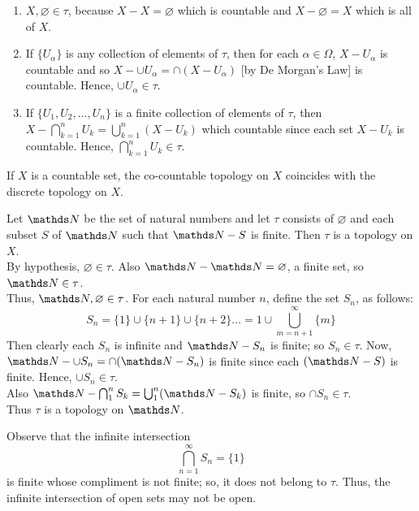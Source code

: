 \documentclass[../main-sheet.tex]{subfiles}
\begin{document}
\begin{enumerate}[label=(\roman*)]
    \item  \(X, \varnothing \in \tau\), because  \(X-X=\varnothing\) which is countable and  \(X-\varnothing=X\) which is all of  \(X\).
    \item If  \(\{U_\alpha\}\) is any collection of elements of  \(\tau\), then for each  \(\alpha\in\Omega\),  \(X-U_\alpha\) is countable and so  \(X-\cup U_\alpha =\cap (X-U_\alpha)\) [by De Morgan's Law] is countable. Hence,  \(\cup U_\alpha \in \tau\).
    \item If  \(\{U_1, U_2,\dots, U_n\}\) is a finite collection of elements of  \(\tau\), then  \(\displaystyle X-\bigcap_{k=1}^n U_k=\bigcup_{k=1}^n (X-U_k)\) which countable since each set  \(X - U_k\) is countable. Hence, \(\displaystyle \bigcap_{k=1}^n U_k\in \tau\).
\end{enumerate}
\begin{rem}
    If  \(X\) is a countable set, the co-countable topology on  \(X\) coincides with the discrete topology on  \(X\).
\end{rem}
\begin{ex}
    Let  \(\N\) be the set of natural numbers and let  \(\tau\) consists of  \(\varnothing\) and each subset  \(S\) of  \(\N\) such that  \(\N - S\) is finite. Then  \(\tau\) is a topology on  \(X\).\\
    By hypothesis,  \(\varnothing \in \tau\). Also  \(\N-\N = \varnothing\), a finite set, so  \(\N\in\tau\).\\
    Thus,  \(\N, \varnothing \in \tau\).
    For each natural number  \(n\), define the set  \(S_n\), as follows:
    \[S_n=\{1\} \cup \{n+1\} \cup \{n + 2\}\dots = {1} \cup \bigcup_{m=n+1}^{\infty}\{m\}\]
    Then clearly each  \(S_n\) is infinite and  \(\N-S_n\) is finite; so  \(S_n \in \tau\). Now,  \(\N-\cup S_n =\cap (\N-S_n)\) is finite since each  \((\N-S)\) is finite. Hence,  \(\cup S_n \in \tau\).\\
    Also  \(\N - \bigcap_1^n S_k = \bigcup_1^n(\N-S_k)\) is finite, so  \(\cap S_n \in \tau\).\\
    Thus  \(\tau\) is a topology on  \(\N\).
\end{ex}
Observe that the infinite intersection
\[
    \bigcap_{n=1}^\infty S_n=\{1\}
\]
is finite whose compliment is not finite; so, it does not belong to  \(\tau\). Thus, the infinite intersection of open sets may not be open.
\end{document}
